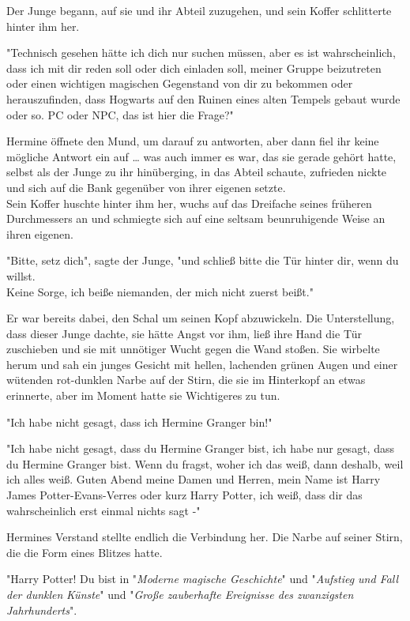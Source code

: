 {Der Junge begann, auf sie und ihr Abteil zuzugehen, und sein Koffer schlitterte hinter ihm her.

"Technisch gesehen hätte ich dich nur suchen müssen, aber es ist wahrscheinlich, dass ich mit dir reden soll oder dich einladen soll, meiner Gruppe beizutreten oder einen wichtigen magischen Gegenstand von dir zu bekommen oder herauszufinden, dass Hogwarts auf den Ruinen eines alten Tempels gebaut wurde oder so. PC oder NPC, das ist hier die Frage?"

Hermine öffnete den Mund, um darauf zu antworten, aber dann fiel ihr keine mögliche Antwort ein auf … was auch immer es war, das sie gerade gehört hatte, selbst als der Junge zu ihr hinüberging, in das Abteil schaute, zufrieden nickte und sich auf die Bank gegenüber von ihrer eigenen setzte.\\ Sein Koffer huschte hinter ihm her, wuchs auf das Dreifache seines früheren Durchmessers an und schmiegte sich auf eine seltsam beunruhigende Weise an ihren eigenen.

"Bitte, setz dich", sagte der Junge, "und schließ bitte die Tür hinter dir, wenn du willst.\\ Keine Sorge, ich beiße niemanden, der mich nicht zuerst beißt."

Er war bereits dabei, den Schal um seinen Kopf abzuwickeln. Die Unterstellung, dass dieser Junge dachte, sie hätte Angst vor ihm, ließ ihre Hand die Tür zuschieben und sie mit unnötiger Wucht gegen die Wand stoßen. Sie wirbelte herum und sah ein junges Gesicht mit hellen, lachenden grünen Augen und einer wütenden rot-dunklen Narbe auf der Stirn, die sie im Hinterkopf an etwas erinnerte, aber im Moment hatte sie Wichtigeres zu tun.

"Ich habe nicht gesagt, dass ich Hermine Granger bin!"

"Ich habe nicht gesagt, dass du Hermine Granger bist, ich habe nur gesagt, dass du Hermine Granger bist. Wenn du fragst, woher ich das weiß, dann deshalb, weil ich alles weiß. Guten Abend meine Damen und Herren, mein Name ist Harry James Potter-Evans-Verres oder kurz Harry Potter, ich weiß, dass dir das wahrscheinlich erst einmal nichts sagt -"

Hermines Verstand stellte endlich die Verbindung her. Die Narbe auf seiner Stirn, die die Form eines Blitzes hatte.

"Harry Potter! Du bist in "\emph{Moderne magische Geschichte}" und "\emph{Aufstieg und Fall der dunklen} \emph{Künste}" und "\emph{Große zauberhafte Ereignisse des zwanzigsten Jahrhunderts}".

}
